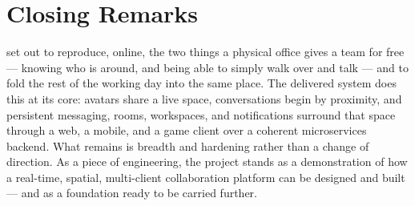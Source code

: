 \section{Closing Remarks}

\voname{} set out to reproduce, online, the two things a physical office gives a
team for free --- knowing who is around, and being able to simply walk over and
talk --- and to fold the rest of the working day into the same place. The
delivered system does this at its core: avatars share a live space, conversations
begin by proximity, and persistent messaging, rooms, workspaces, and notifications
surround that space through a web, a mobile, and a game client over a coherent
microservices backend. What remains is breadth and hardening rather than a change
of direction. As a piece of engineering, the project stands as a demonstration of
how a real-time, spatial, multi-client collaboration platform can be designed and
built --- and as a foundation ready to be carried further.
